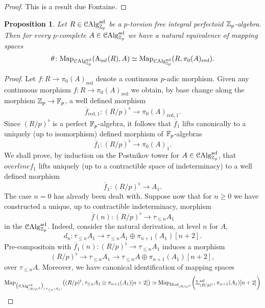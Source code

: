 \documentclass[10pt,a4paper]{amsart}
\numberwithin{equation}{subsection}
\newtheorem{proposition}[theorem]{Proposition}
\theoremstyle{definition}
\begin{document}
\begin{proof}
    This is a result due Fontaine.
\end{proof}

\begin{proposition} \label{Ainf_de_Rham}
    Let $R \in \mathcal C \mathrm{Alg}^{\mathrm{ad}}_{\mathbb Z_p}$ be a $p$-torsion free integral perfectoid $\mathbb Z_p$-algebra. Then for every $p$-complete $A \in \mathcal C \mathrm{Alg}^{\mathrm{ad}}_{\mathbb Z_p}$ we have a natural equivalence of mapping spaces
        \[
               \theta \colon \mathrm{Map}_{\mathcal C \mathrm{Alg}^{\mathrm{ad}}_{\mathbb Z_p}}(\mathrm{A}_{\mathrm{inf}}(R), A) \simeq   \mathrm{Map}_{\mathcal C \mathrm{Alg}^{\mathrm{ad}}_{\mathbb Z_p}}(R, \pi_0(A)_\mathrm{red}) .
        \]
\end{proposition}

\begin{proof}
    Let $f \colon R \to \pi_0(A)_\mathrm{red}$ denote a continuous $p$-adic morphism. Given any continuous morphism $f \colon R \to \pi_0(A)_\mathrm{red}$ we obtain, by base change along the morphism $\mathbb Z_p \to \mathbb F_p$, a well defined morphism
        \[
            \overline{f}_{\mathrm{red}, 1} \colon (R/p)^\flat \to \pi_0(A)_{\mathrm{red}, 1} . 
        \]
    Since $(R/p)^\flat $ is a perfect $\mathbb F_p$-algebra, it follows that $\overline{f}_1$ lifts canonically to a uniquely (up to isomorphism) defined morphism of $\mathbb F_p$-algebras
        \[
            \overline{f}_1 \colon (R/p)^\flat \to \pi_0(A)_1.  
        \]
    We shall prove, by induction on the Postnikov tower for $A \in \mathcal C \mathrm{Alg}^{\mathrm{ad}}_{\mathbb Z_p}$, that $overline{f}_1$ lifts uniquely (up to a contractible space of indeterminacy) to a well defined morphism
        \[
            \overline{f}_1 \colon (R/p)^\flat \to A_1.
        \]
    The case $n=0$ has already been dealt with. Suppose now that for $n \geq 0$ we have constructed a unique, up to contractible indeterminacy, morphism
        \[
            \overline{f}(n) \colon (R/p)^\flat \to \tau_{\leq n} A_1  
        \]
    in the \infcat $\mathcal C \mathrm{Alg}^{\mathrm{ad}}_{\mathbb Z_p}$. Indeed, consider the natural derivation, at level $n$ for $A$,
        \[
                d_n \colon \tau_{\leq n} A_1 \to \tau_{\leq n}A_1 \oplus \pi_{n+1}(A_1)[n+2].
        \]
    Pre-compositoin with $\overline{f}_1(n) \colon (R/p)^\flat \to \tau_{\leq n}A_1$ induces a morphism 
        \[
                (R/p)^\flat \to \tau_{\leq n}A_1 \to \tau_{\leq n}A   \oplus \pi_{n+1}(A_1)[n+2],
        \]
    over $\tau_{\leq n}A$. Moreover, we have canonical identification of mapping spaces
        \[
                \mathrm{Map}_{\big(\mathcal C \mathrm{Alg}^{\mathrm{ad}}_{(R/p)^\flat}\big)_{/ \tau_{\leq n}(A_1) }} \big((R/p)^\flat, \tau_{\leq n}A_1 \oplus \pi_{n+1}(A_1)[n+2] \big) \simeq
                \mathrm{Map}_{\mathrm{Mod}_{(R/p)^\flat}} \bigg(\mathbb{L}^{\mathrm{ad}}_{(R/p)^\flat}, \pi_{n+1}(A_1) [n+2] \bigg)
\]
\end{proof}
\end{document}
